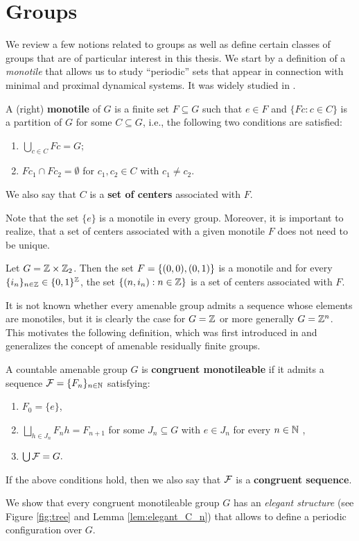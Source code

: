 \section{Groups}\label{section:groups}
We review a few notions related to groups as well as define certain classes of groups that are of particular interest in this thesis.
% 
We start by a definition of a \emph{monotile} that allows us to study ``periodic'' sets that appear in connection with minimal and proximal dynamical systems. It was widely studied in \cite{Weiss01}.

\begin{defn}[Monotile]\label{def:tile}
A (right) {\bf monotile}  of $G$ is a finite set $F\subseteq G$ such that $e\in F$ and $\{Fc: c\in C\}$ is a partition of $G$ for some $C\subseteq G$, i.e., the following two conditions are satisfied:
\begin{enumerate}
\item $\displaystyle \bigcup_{c\in C} Fc = G;$
\item $Fc_1\cap Fc_2=\emptyset$ for $c_1,c_2\in C$ with $c_1\neq c_2$.
\end{enumerate}
We also say that $C$ is  a {\bf set of centers} associated with $F$.
\end{defn}

\noindent
Note that the set $\{e\}$ is a monotile in every group. Moreover, it is important to realize, that a set of centers associated with a given monotile $F$ does not need to be unique.
\begin{example}
Let $G=\mathbb{Z}\times\mathbb{Z}_2$. Then the set $F=\left\{(0,0),(0,1)\right\}$ is a monotile and for every $\{i_n\}_{n\in\mathbb{Z}}\in\{0,1\}^{\mathbb{Z}}$, the set $\{(n,i_n):n\in\mathbb{Z}\}$ is a set of centers associated with $F$.
\end{example}

\noindent
It is not known whether every amenable group admits a \Folner sequence whose elements are monotiles, but it is clearly the case for $G=\mathbb{Z}$ or more generally $G=\mathbb{Z}^n$. This motivates the following definition, which was first introduced in \cite{CC19} and generalizes the concept of amenable residually finite groups.

\begin{defn}\label{def:congruent_monotilable}
A countable amenable group $G$ is  {\bf congruent monotileable} if it admits a \Folner sequence $\operatorname{\mathcal{F}}=\{F_n\}_{n\in\mathbb{N}}$ satisfying:
\begin{enumerate}
\item $F_0=\{e\}$,
\item $\displaystyle\bigsqcup_{h\in J_n}F_nh=F_{n+1}$ for some  $J_n\subseteq G$ with $e\in J_n$ for every $n\in\mathbb{N}$ ,
\item $\bigcup\operatorname{\mathcal{F}}=G.$
\end{enumerate}
If the above conditions hold, then we also say that $\operatorname{\mathcal{F}}$ is a {\bf congruent \Folner sequence}.
\end{defn}
\noindent
We show that every congruent monotileable group $G$ has an \emph{elegant structure} (see Figure \ref{fig:tree} and Lemma \ref{lem:elegant_C_n}) that allows to define a periodic configuration over $G$.

